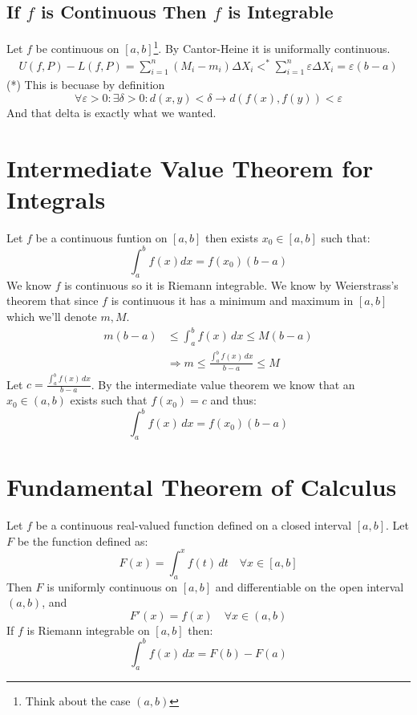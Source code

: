 \documentclass{article}
\begin{document}
	\subsection{If $f$ is Continuous Then $f$ is Integrable}
	Let $f$ be continuous on $[a,b]$\footnote{Think about the case $(a,b)$}. 
	By Cantor-Heine it is uniformally continuous.
	\begin{align*}
		U(f,P) - L(f,P) = \sum_{i=1}^{n}(M_i-m_i)\Delta X_i 
		<^{*} \sum_{i=1}^n\varepsilon\Delta X_i = \varepsilon(b-a)
	\end{align*}
	(*) This is becuase by definition
	\[
		\forall \varepsilon > 0 \colon \exists \delta > 0 \colon 
		d(x,y)<\delta \rightarrow d(f(x),f(y))<\varepsilon
	\]
	And that delta is exactly what we wanted.

	\newpage
	
	\section{Intermediate Value Theorem for Integrals}
	Let $f$ be a continuous funtion on $[a,b]$ then exists $x_0\in[a,b]$ such that: 
	\[
		\int_a^b{f(x)dx}=f(x_0)(b-a)
	\]
	We know $f$ is continuous so it is Riemann integrable. 
	We know by Weierstrass's theorem that since $f$ is continuous 
	it has a minimum and maximum in $[a,b]$ which we'll denote $m, M$.
	\begin{align*}
	m(b-a) &\le \int_a^b{f(x)\,dx} \le M(b-a) \\
	&\Rightarrow m \le \frac{\int_{a}^{b}{f(x)\,dx}}{b-a} \le M
	\end{align*}
	Let $c = \frac{\int_{a}^{b}{f(x)\,dx}}{b-a}$. 
	By the intermediate value theorem we know that an $x_0 \in (a,b)$ exists such that 
	$f(x_0) = c$ and thus:
	\[
		\int_{a}^{b}{f(x)\,dx} = f(x_0)(b-a)
	\]

	\newpage
	
	\section{Fundamental Theorem of Calculus}
	Let $f$ be a continuous real-valued function defined on a closed interval $[a, b]$. 
	Let $F$ be the function defined as:
	\[
		F(x) = \int_{a}^{x}{f(t)\,dt} \quad \forall x \in [a, b]
	\]
	Then $F$ is uniformly continuous on $[a, b]$ and 
	differentiable on the open interval $(a, b)$, and
	\[
		F'(x) = f(x) \quad \forall x \in (a, b)
	\]
	If $f$ is Riemann integrable on $[a, b]$ then:
	\[
		\int_{a}^{b}{f(x)\,dx} = F(b)-F(a)
	\]
	
\end{document}
